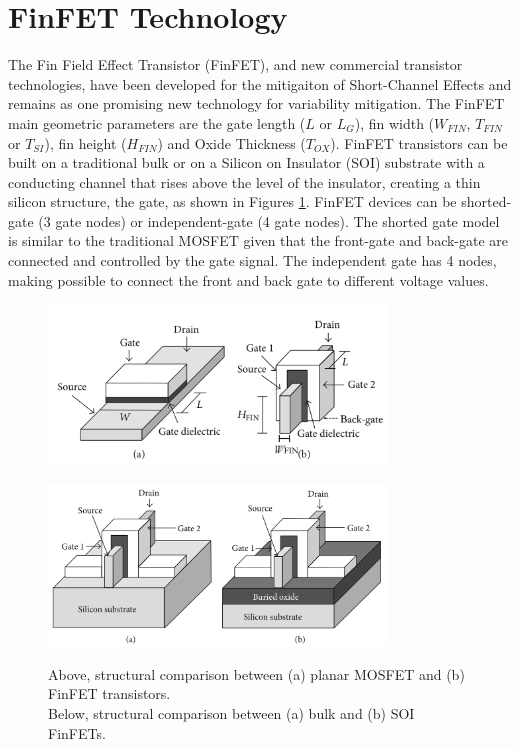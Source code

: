 \documentclass[diss,pgmicro,english]{iiufrgs}
\begin{document}
\section{FinFET Technology}

The Fin Field Effect Transistor (FinFET), and new commercial transistor technologies, have been developed for the mitigaiton of Short-Channel Effects and remains as one promising new technology for variability mitigation. The FinFET main geometric parameters are the gate length ($L$ or $L_G$), fin width ($W_{FIN}$, $T_{FIN}$ or $T_{SI}$), fin height ($H_{FIN}$) and Oxide Thickness ($T_{OX}$). FinFET transistors can be built on a traditional bulk or on a Silicon on Insulator (SOI) substrate with a conducting channel that rises above the level of the insulator, creating a thin silicon structure, the gate, as shown in Figures \ref{finfet}. FinFET devices can be shorted-gate (3 gate nodes) or independent-gate (4 gate nodes). The shorted gate model is similar to the traditional MOSFET given that the front-gate and back-gate are connected and controlled by the gate signal. The independent gate has 4 nodes, making possible to connect the front and back gate to different voltage values.

    \begin{figure} [t]
        \centering
	\includegraphics[width=0.8\textwidth, trim={0 0 0 0},clip]{finfet.pdf}
        \caption{Above, structural comparison between (a) planar MOSFET and (b) FinFET transistors. \\
		Below, structural comparison between (a) bulk and (b) SOI FinFETs.}

        \centering
        \includegraphics[width=0.8\textwidth, trim={0 0 0 0},clip]{finfet2.png}
        \label{finfet}
    \end{figure}
\end{document}

